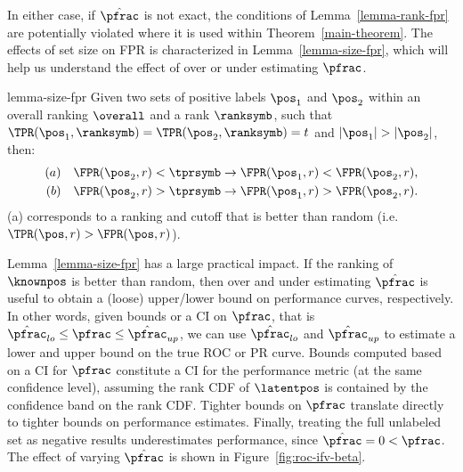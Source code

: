 

In either case, if $\hat{\pfrac}$ is not exact, the conditions of Lemma~\ref*{lemma-rank-fpr} are potentially violated where it is used within Theorem~\ref{main-theorem}. The effects of set size on FPR is characterized in Lemma~\ref*{lemma-size-fpr}, which will help us understand the effect of over or under estimating $\pfrac$.


\begin{replemma}{lemma-size-fpr}
Given two sets of positive labels $\pos_1$ and $\pos_2$ within an overall ranking $\overall$ and a rank $\ranksymb$, such that $\TPR(\pos_1,\ranksymb) = \TPR(\pos_2,\ranksymb)=t$ and $|\pos_1| > |\pos_2|$, then:
\begin{align*}
(a)\quad \FPR(\pos_2, r) < \tprsymb &\rightarrow \FPR(\pos_1, r) < \FPR(\pos_2, r), \\
(b)\quad \FPR(\pos_2, r) > \tprsymb &\rightarrow \FPR(\pos_1, r) > \FPR(\pos_2, r).
\end{align*}
(a) corresponds to a ranking and cutoff that is better than random (i.e. $\TPR(\pos,r) > \FPR(\pos,r)$).%
\end{replemma}

Lemma~\ref*{lemma-size-fpr} has a large practical impact. If the ranking of $\knownpos$ is better than random, then over and under estimating $\hat{\pfrac}$ is useful to obtain a (loose) upper/lower bound on performance curves, respectively. In other words, given bounds or a CI on $\pfrac$, that is $\hat{\pfrac}_{lo} \leq \pfrac \leq \hat{\pfrac}_{up}$, we can use $\hat{\pfrac}_{lo}$ and $\hat{\pfrac}_{up}$ to estimate a lower and upper bound on the true ROC or PR curve. Bounds computed based on a CI for $\pfrac$ constitute a CI for the performance metric (at the same confidence level), assuming the rank CDF of $\latentpos$ is contained by the confidence band on the rank CDF. Tighter bounds on $\pfrac$ translate directly to tighter bounds on performance estimates. Finally, treating the full unlabeled set as negative results underestimates performance, since $\hat{\pfrac}=0 < \pfrac$. The effect of varying $\hat{\pfrac}$ is shown in Figure~\ref{fig:roc-ifv-beta}.


